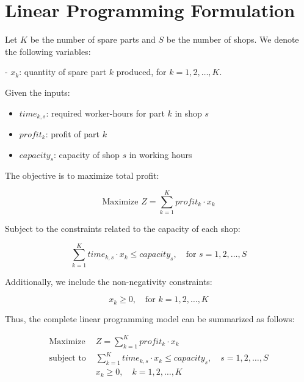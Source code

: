 \documentclass{article}
\begin{document}
\section*{Linear Programming Formulation}

Let \( K \) be the number of spare parts and \( S \) be the number of shops. We denote the following variables:

- \( x_k \): quantity of spare part \( k \) produced, for \( k = 1, 2, \ldots, K \).

Given the inputs:
\begin{itemize}
    \item \( time_{k,s} \): required worker-hours for part \( k \) in shop \( s \)
    \item \( profit_k \): profit of part \( k \)
    \item \( capacity_s \): capacity of shop \( s \) in working hours
\end{itemize}

The objective is to maximize total profit:

\[
\text{Maximize } Z = \sum_{k=1}^{K} profit_k \cdot x_k
\]

Subject to the constraints related to the capacity of each shop:

\[
\sum_{k=1}^{K} time_{k,s} \cdot x_k \leq capacity_s, \quad \text{for } s = 1, 2, \ldots, S
\]

Additionally, we include the non-negativity constraints:

\[
x_k \geq 0, \quad \text{for } k = 1, 2, \ldots, K
\]

Thus, the complete linear programming model can be summarized as follows:

\begin{align*}
\text{Maximize } & Z = \sum_{k=1}^{K} profit_k \cdot x_k \\
\text{subject to } & \sum_{k=1}^{K} time_{k,s} \cdot x_k \leq capacity_s, \quad s = 1, 2, \ldots, S \\
& x_k \geq 0, \quad k = 1, 2, \ldots, K
\end{align*}
\end{document}
